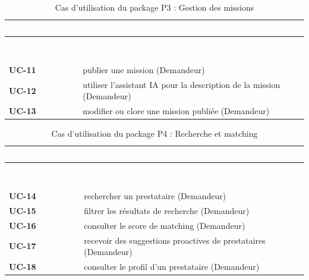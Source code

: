 \begin{table}[H]
	\caption{Cas d'utilisation du package P3 : Gestion des missions}
	\label{tab:cu_p3}
	\centering
	\begin{tabular}{|p{3cm}|p{10.5cm}|}
		\hline
		\multicolumn{2}{|c|}{\cellcolor{vertCongo}\textcolor{white}{\textbf{Package P3 : Gestion des missions}}} \\
		\hline
		\rowcolor{vertCongo}
		\textcolor{white}{\textbf{Cas d'utilisation}} & \textcolor{white}{\textbf{Définition}} \\
		\hline
		\textbf{UC-11} & publier une mission (Demandeur) \\
		\hline
		\textbf{UC-12} & utiliser l'assistant IA pour la description de la mission (Demandeur) \\
		\hline
		\textbf{UC-13} & modifier ou clore une mission publiée (Demandeur) \\
		\hline
	\end{tabular}
\end{table}

\begin{table}[H]
	\caption{Cas d'utilisation du package P4 : Recherche et matching}
	\label{tab:cu_p4}
	\centering
	\begin{tabular}{|p{3cm}|p{10.5cm}|}
		\hline
		\multicolumn{2}{|c|}{\cellcolor{vertCongo}\textcolor{white}{\textbf{Package P4 : Recherche et matching}}} \\
		\hline
		\rowcolor{vertCongo}
		\textcolor{white}{\textbf{Cas d'utilisation}} & \textcolor{white}{\textbf{Définition}} \\
		\hline
		\textbf{UC-14} & rechercher un prestataire (Demandeur) \\
		\hline
		\textbf{UC-15} & filtrer les résultats de recherche (Demandeur) \\
		\hline
		\textbf{UC-16} & consulter le score de matching (Demandeur) \\
		\hline
		\textbf{UC-17} & recevoir des suggestions proactives de prestataires (Demandeur) \\
		\hline
		\textbf{UC-18} & consulter le profil d'un prestataire (Demandeur) \\
		\hline
	\end{tabular}
\end{table}

